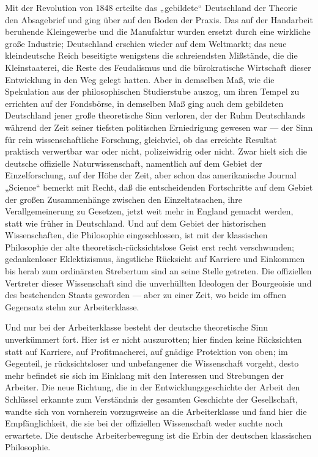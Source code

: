 Mit der Revolution von 1848 erteilte das „gebildete`` Deutschland
der Theorie den Absagebrief und ging über auf den Boden der Praxis. Das
auf der Handarbeit beruhende Kleingewerbe und die Manufaktur wurden
ersetzt durch eine wirkliche große Industrie; Deutschland erschien
wieder auf dem Weltmarkt; das neue kleindeutsche Reich beseitigte
wenigstens die schreiendsten Mißstände, die die Kleinstaaterei, die
Reste des Feudalismus und die bürokratische Wirtschaft dieser
Entwicklung in den Weg gelegt hatten. Aber in demselben Maß, wie die
Spekulation aus der philosophischen Studierstube auszog, um ihren Tempel
zu errichten auf der Fondsbörse, in demselben Maß ging auch dem
gebildeten Deutschland jener große theoretische Sinn verloren, der der
Ruhm Deutschlands während der Zeit seiner tiefsten politischen
Erniedrigung gewesen war --- der Sinn für rein wissenschaftliche
Forschung, gleichviel, ob das erreichte Resultat praktisch verwertbar
war oder nicht, polizeiwidrig oder nicht. Zwar hielt sich die deutsche
offizielle Naturwissenschaft, namentlich auf dem Gebiet der
Einzelforschung, auf der Höhe der Zeit, aber schon das amerikanische
Journal „Science`` bemerkt mit Recht, daß die entscheidenden Fortschritte
auf dem Gebiet der großen Zusammenhänge zwischen den Einzeltatsachen,
ihre Verallgemeinerung zu Gesetzen, jetzt weit mehr in England gemacht
werden, statt wie früher in Deutschland. Und auf dem Gebiet der
historischen Wissenschaften, die Philosophie eingeschlossen, ist mit der
klassischen Philosophie der alte theoretisch-rücksichtslose Geist erst
recht verschwunden; gedankenloser Eklektizismus, ängstliche Rücksicht
auf Karriere und Einkommen bis herab zum ordinärsten Strebertum sind an
seine Stelle getreten. Die offiziellen Vertreter dieser Wissenschaft
sind die unverhüllten Ideologen der Bourgeoisie und des bestehenden
Staats geworden --- aber zu einer Zeit, wo beide im offnen Gegensatz stehn
zur Arbeiterklasse.

Und nur bei der Arbeiterklasse besteht der deutsche theoretische
Sinn unverkümmert fort. Hier ist er nicht auszurotten; hier finden keine
Rücksichten statt auf Karriere, auf Profitmacherei, auf gnädige
Protektion von oben; im Gegenteil, je rücksichtsloser und unbefangener
die Wissenschaft vorgeht, desto mehr befindet sie sich im Einklang mit
den Interessen und Strebungen der Arbeiter. Die neue Richtung, die in
der Entwicklungsgeschichte der Arbeit den Schlüssel erkannte zum
Verständnis der gesamten Geschichte der Gesellschaft, wandte sich von
vornherein vorzugsweise an die Arbeiterklasse und fand hier die
Empfänglichkeit, die sie bei der offiziellen Wissenschaft weder suchte
noch erwartete. Die deutsche Arbeiterbewegung ist die Erbin der
deutschen klassischen Philosophie.

\quebra

